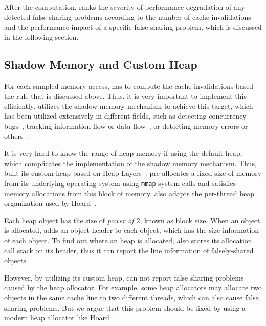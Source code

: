       
After the computation, 
\cheetah{} ranks the severity of performance degradation of any detected false sharing problems according to the number of cache invalidations and the performance impact of a specific false sharing problem, which is discussed in the following section.  


\subsection{Shadow Memory and Custom Heap}

For each sampled memory access, \cheetah{} has to compute the cache invalidations based the rule that is discussed above. Thus, it is very important to implement this efficiently. \Cheetah{} utilizes the shadow memory mechanism to achieve this target, which has been utilized extensively in different fields, such as detecting concurrency bugs~\cite{Harrow:2000:RCM:645880.672080, helgrind, 404681, Savage:1997:EDD:268998.266641}, tracking information flow or data flow~\cite{Cheng:2006:TEF:1157733.1157903, Newsome05dynamictaint, Qin:2006:LLP:1194816.1194834}, or detecting memory errors or others~\cite{qinzhao, Hastings91purify:fast, Seward:2005:UVD:1247360.1247362, Narayanasamy:2006:ALO:1140277.1140303}. 

It is very hard to know the range of heap memory if using the default heap, which complicates the implementation of the shadow memory mechanism. Thus, \cheetah{} built its custom heap based on Heap Layers~\cite{heaplayers}. \cheetah{} pre-allocates a fixed size of memory
from its underlying operating system using \texttt{mmap} system calls and satisfies memory allocations from this block of memory. \cheetah{} also adapts the per-thread heap organization used by Hoard~\cite{Hoard}. 

Each heap object has the size of {\it power of $2$}, known as block size. When an object is allocated, \cheetah{} adds an object header to each object, which has the size information of each object. To find out where an heap is allocated, \cheetah{} also stores its allocation call stack on its header, thus it can report the line information of falsely-shared objects. 

However, by utilizing its custom heap, \cheetah{} can not report false sharing problems caused by the heap allocator. For example, some heap allocators may allocate two objects in the same cache line to two different threads, which can also cause false sharing problems. But we argue that this problem should be fixed by using a modern heap allocator like Hoard~\cite{Hoard}.  

